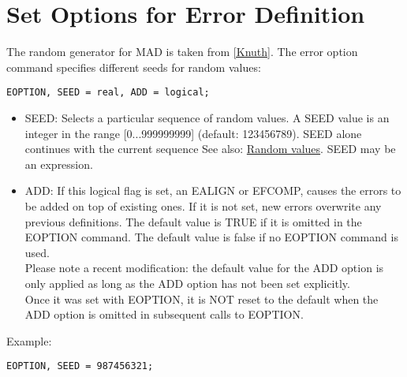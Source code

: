 
\section{Set Options for Error Definition} %
The random generator for MAD is taken from
\href{../Introduction/bibliography.html#knuth}{[Knuth]}. The error
option command specifies different seeds for random values:  

\begin{verbatim}
EOPTION, SEED = real, ADD = logical;
\end{verbatim}

\begin{itemize}
   \item SEED: Selects a particular sequence of random values. A SEED
     value is an integer in the range [0...999999999] (default:
     123456789). SEED alone continues with the current sequence See
     also: \href{../Introduction/expression.html#random}{Random
       values}. SEED may be an expression.  
   \item ADD: If this logical flag is set, an EALIGN or EFCOMP, causes
     the errors to be added on top of existing ones. If it is not set,
     new errors overwrite any previous definitions. The default value is
     TRUE if it is omitted in the EOPTION command. The default value is
     false if no EOPTION command is used.  
\\Please note a recent modification: the default value for the ADD
option is only applied as long as the ADD option has not been set
explicitly. 
\\Once it was set with EOPTION, it is NOT reset to the default when
the ADD option is omitted in subsequent calls to EOPTION.  
\end{itemize} 

Example: 
\begin{verbatim}
EOPTION, SEED = 987456321;
\end{verbatim}

